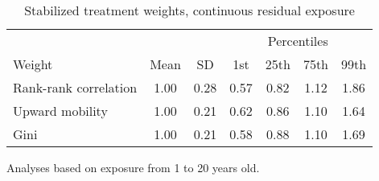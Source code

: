 \begin{table}[htp]
\centering
\footnotesize
\setlength{\tabcolsep}{10pt}
\renewcommand{\arraystretch}{1}
\begin{threeparttable}
\centering
\caption{Stabilized treatment weights, continuous residual exposure} 
\label{tab:psid_ipt_weigths_z}
\begin{tabular}{lcccccc}
  \hline
\multicolumn{3}{c}{} & \multicolumn{4}{c}{Percentiles} \\ 
 \cmidrule{4-7} 
Weight & Mean & SD & 1st & 25th & 75th & 99th \\ 
  \hline
Rank-rank correlation & 1.00 & 0.28 & 0.57 & 0.82 & 1.12 & 1.86 \\ 
  Upward mobility & 1.00 & 0.21 & 0.62 & 0.86 & 1.10 & 1.64 \\ 
  Gini & 1.00 & 0.21 & 0.58 & 0.88 & 1.10 & 1.69 \\ 
   \hline
\end{tabular}
\begin{tablenotes}
\footnotesize
\item Analyses based on exposure from 1 to 20 years old. 
\end{tablenotes}
\end{threeparttable}
\end{table}
